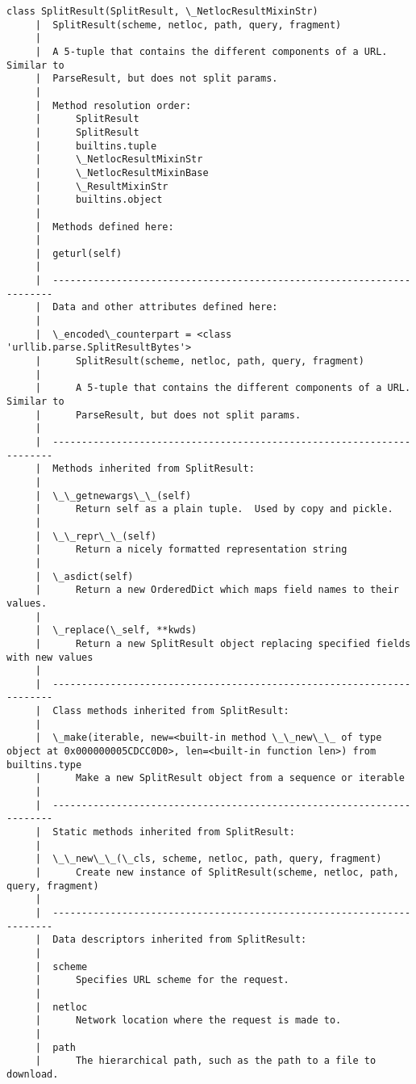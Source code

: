\documentclass[11pt]{article}
\begin{document}
\begin{Verbatim}[commandchars=\\\{\}]
    class SplitResult(SplitResult, \_NetlocResultMixinStr)
     |  SplitResult(scheme, netloc, path, query, fragment)
     |  
     |  A 5-tuple that contains the different components of a URL. Similar to
     |  ParseResult, but does not split params.
     |  
     |  Method resolution order:
     |      SplitResult
     |      SplitResult
     |      builtins.tuple
     |      \_NetlocResultMixinStr
     |      \_NetlocResultMixinBase
     |      \_ResultMixinStr
     |      builtins.object
     |  
     |  Methods defined here:
     |  
     |  geturl(self)
     |  
     |  ----------------------------------------------------------------------
     |  Data and other attributes defined here:
     |  
     |  \_encoded\_counterpart = <class 'urllib.parse.SplitResultBytes'>
     |      SplitResult(scheme, netloc, path, query, fragment)
     |      
     |      A 5-tuple that contains the different components of a URL. Similar to
     |      ParseResult, but does not split params.
     |  
     |  ----------------------------------------------------------------------
     |  Methods inherited from SplitResult:
     |  
     |  \_\_getnewargs\_\_(self)
     |      Return self as a plain tuple.  Used by copy and pickle.
     |  
     |  \_\_repr\_\_(self)
     |      Return a nicely formatted representation string
     |  
     |  \_asdict(self)
     |      Return a new OrderedDict which maps field names to their values.
     |  
     |  \_replace(\_self, **kwds)
     |      Return a new SplitResult object replacing specified fields with new values
     |  
     |  ----------------------------------------------------------------------
     |  Class methods inherited from SplitResult:
     |  
     |  \_make(iterable, new=<built-in method \_\_new\_\_ of type object at 0x000000005CDCC0D0>, len=<built-in function len>) from builtins.type
     |      Make a new SplitResult object from a sequence or iterable
     |  
     |  ----------------------------------------------------------------------
     |  Static methods inherited from SplitResult:
     |  
     |  \_\_new\_\_(\_cls, scheme, netloc, path, query, fragment)
     |      Create new instance of SplitResult(scheme, netloc, path, query, fragment)
     |  
     |  ----------------------------------------------------------------------
     |  Data descriptors inherited from SplitResult:
     |  
     |  scheme
     |      Specifies URL scheme for the request.
     |  
     |  netloc
     |      Network location where the request is made to.
     |  
     |  path
     |      The hierarchical path, such as the path to a file to download.

\end{Verbatim}
\end{document}
